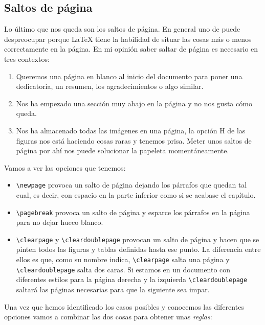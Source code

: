 \subsection{Saltos de página}\label{saltos-de-puxe1gina}

Lo último que nos queda son los saltos de página. En general uno de
puede despreocupar porque LaTeX tiene la habilidad de situar las cosas
más o menos correctamente en la página. En mi opinión saber saltar de
página es necesario en tres contextos:

\begin{enumerate}
\def\labelenumi{\arabic{enumi}.}
\item
  Queremos una página en blanco al inicio del documento para poner una
  dedicatoria, un resumen, los agradecimientos o algo similar.
\item
  Nos ha empezado una sección muy abajo en la página y no nos gusta cómo
  queda.
\item
  Nos ha almacenado todas las imágenes en una página, la opción H de las
  figuras nos está haciendo cosas raras y tenemos prisa. Meter unos
  saltos de página por ahí nos puede solucionar la papeleta
  momentáneamente.
\end{enumerate}

Vamos a ver las opciones que tenemos:

\begin{itemize}
\item
  \lstinline!\newpage! provoca un salto de página dejando los párrafos
  que quedan tal cual, es decir, con espacio en la parte inferior como
  si se acabase el capítulo.
\item
  \lstinline!\pagebreak! provoca un salto de página y esparce los
  párrafos en la página para no dejar hueco blanco.
\item
  \lstinline!\clearpage! y \lstinline!\cleardoublepage! provocan un
  salto de página y hacen que se pinten todos las figuras y tablas
  definidas hasta ese punto. La diferencia entre ellos es que, como su
  nombre indica, \lstinline!\clearpage! salta una página y
  \lstinline!\cleardoublepage! salta dos caras. Si estamos en un
  documento con diferentes estilos para la página derecha y la izquierda
  \lstinline!\cleardoublepage! saltará las páginas necesarias para que
  la siguiente sea impar.
\end{itemize}

Una vez que hemos identificado los casos posibles y conocemos las
diferentes opciones vamos a combinar las dos cosas para obtener unas
\emph{reglas}:

